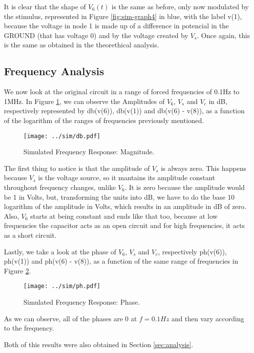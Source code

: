 It is clear that the shape of $V_6(t)$ is the same as before, only now modulated by the stimulus, represented in Figure \ref{fig:sim-graph4} in blue, with the label v(1), because the voltage in node 1 is made up of a difference in potencial in the GROUND (that has voltage 0) and by the voltage created by $V_s$. Once again, this is the same as obtained in the theorethical analysis.

\subsection{Frequency Analysis}
\label{subsec:sim_freq}

We now look at the original circuit in a range of forced frequencies of 0.1Hz to 1MHz. In Figure \ref{fig:sim_db}, we can observe the Amplitudes of $V_6$, $V_s$ and $V_c$ in dB, respectively represented by db(v(6)), db(v(1)) and db(v(6) - v(8)), as a function of the logarithm of the ranges of frequencies previously mentioned.

\begin{figure}[H] \centering
\texttt{[image: ../sim/db.pdf]}
\caption{Simulated Frequency Response: Magnitude.}
\label{fig:sim_db}
\end{figure}

The first thing to notice is that the amplitude of $V_s$ is always zero. This happens because $V_s$ is the voltage source, so it mantains its amplitude constant throughout frequency changes, unlike $V_6$. It is zero because the amplitude would be 1 in Volts, but, transforming the units into dB, we have to do the base 10 logarithm of the amplitude in Volts, which results in an amplitude in dB of zero. Also, $V_6$ starts at being constant and ends like that too, because at low frequencies the capacitor acts as an open circuit and for high frequencies, it acts as a short circuit.
\par
Lastly, we take a look at the phase of $V_6$, $V_s$ and $V_c$, respectively ph(v(6)), ph(v(1)) and ph(v(6) - v(8)), as a function of the same range of frequencies in Figure \ref{fig:sim_ph}.

\begin{figure}[H] \centering
\texttt{[image: ../sim/ph.pdf]}
\caption{Simulated Frequency Response: Phase.}
\label{fig:sim_ph}
\end{figure}


As we can observe, all of the phases are 0 at $f=0.1Hz$ and then vary according to the frequency.
\par
Both of this results were also obtained in Section \ref{sec:analysis}.











